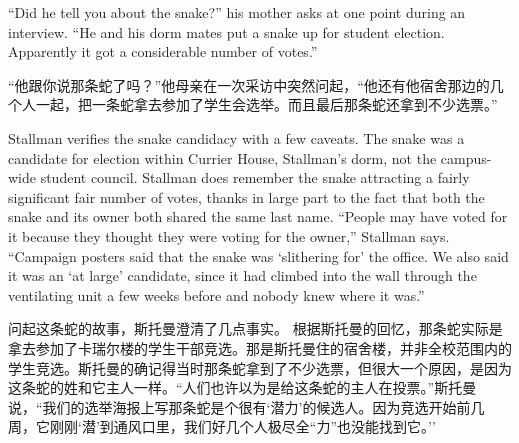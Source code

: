 \ifdefined\eng
``Did he tell you about the snake?'' his mother asks at one point during an interview. ``He and his dorm mates put a snake up for student election. Apparently it got a considerable number of votes.''
\fi

\ifdefined\chs
``他跟你说那条蛇了吗？''他母亲在一次采访中突然问起，``他还有他宿舍那边的几个人一起，把一条蛇拿去参加了学生会选举。而且最后那条蛇还拿到不少选票。''
\fi

\ifdefined\eng
\ifdefined\vone
Stallman verifies the snake candidacy with a few caveats.
\fi
The snake was a candidate for election within Currier House, Stallman's dorm, not the campus-wide student council. Stallman does remember the snake attracting a \ifdefined\vone fairly significant \fi\ifdefined\vtwo fair \fi number of votes, thanks in large part to the fact that both the snake and its owner both shared the same last name. ``People may have voted for it because they thought they were voting for the owner,'' Stallman says. ``Campaign posters said that the snake was `slithering for' the office. We also said it was an `at large' candidate, since it had climbed into the wall through the ventilating unit a few weeks before and nobody knew where it was.''
\fi

\ifdefined\chs
\ifdefined\vone
问起这条蛇的故事，斯托曼澄清了几点事实。
\fi
根据斯托曼的回忆，那条蛇实际是拿去参加了卡瑞尔楼的学生干部竞选。那是斯托曼住的宿舍楼，并非全校范围内的学生竞选。斯托曼的确记得当时那条蛇拿到了不少选票，但很大一个原因，是因为这条蛇的姓和它主人一样。``人们也许以为是给这条蛇的主人在投票。''斯托曼说，``我们的选举海报上写那条蛇是个很有`潜力'的候选人。因为竞选开始前几周，它刚刚`潜'到通风口里，我们好几个人极尽全``力''也没能找到它。''
\fi

